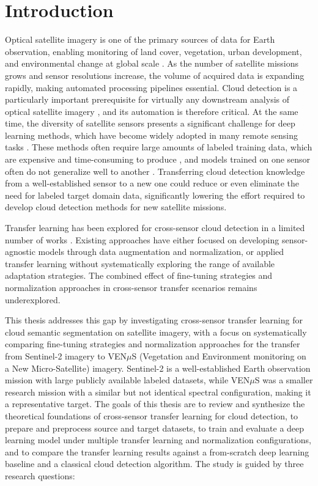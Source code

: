 \chapter{Introduction} 
\label{chap:introduction}

Optical satellite imagery is one of the primary sources of data for Earth observation, enabling monitoring of land cover, vegetation, urban development, and environmental change at global scale \cite{singh2025}. As the number of satellite missions grows and sensor resolutions increase, the volume of acquired data is expanding rapidly, making automated processing pipelines essential. Cloud detection is a particularly important prerequisite for virtually any downstream analysis of optical satellite imagery \cite{zhiwei2022}, and its automation is therefore critical. At the same time, the diversity of satellite sensors presents a significant challenge for deep learning methods, which have become widely adopted in many remote sensing tasks \cite{zhu2017, wright2025}. These methods often require large amounts of labeled training data, which are expensive and time-consuming to produce \cite{wang2024}, and models trained on one sensor often do not generalize well to another \cite{wright2025}. Transferring cloud detection knowledge from a well-established sensor to a new one could reduce or even eliminate the need for labeled target domain data, significantly lowering the effort required to develop cloud detection methods for new satellite missions.

Transfer learning has been explored for cross-sensor cloud detection in a limited number of works \cite{wright2025, garcia2020}. Existing approaches have either focused on developing sensor-agnostic models through data augmentation and normalization, or applied transfer learning without systematically exploring the range of available adaptation strategies. The combined effect of fine-tuning strategies and normalization approaches in cross-sensor transfer scenarios remains underexplored.

This thesis addresses this gap by investigating cross-sensor transfer learning for cloud semantic segmentation on satellite imagery, with a focus on systematically comparing fine-tuning strategies and normalization approaches for the transfer from Sentinel-2 imagery to VEN$\mu$S (Vegetation and Environment monitoring on a New Micro-Satellite) imagery. Sentinel-2 is a well-established Earth observation mission with large publicly available labeled datasets, while VEN$\mu$S was a smaller research mission with a similar but not identical spectral configuration, making it a representative target. The goals of this thesis are to review and synthesize the theoretical foundations of cross-sensor transfer learning for cloud detection, to prepare and preprocess source and target datasets, to train and evaluate a deep learning model under multiple transfer learning and normalization configurations, and to compare the transfer learning results against a from-scratch deep learning baseline and a classical cloud detection algorithm. The study is guided by three research questions:

